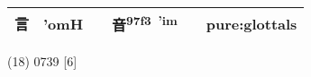 \documentclass[14pt,a4paper]{scrartcl}
\begin{document}
\begin{longtable}[c]{@{}llllll@{}}
\begin{minipage}[t]{0.14\columnwidth}
言
\strut\end{minipage} &
\begin{minipage}[t]{0.14\columnwidth}\raggedright\strut
'omH
\strut\end{minipage} &
\begin{minipage}[t]{0.14\columnwidth}\raggedright\strut
\strut\end{minipage} &
\begin{minipage}[t]{0.14\columnwidth}\raggedright\strut
音\textsuperscript{97f3~'im}
\strut\end{minipage} &
\begin{minipage}[t]{0.14\columnwidth}\raggedright\strut
\strut\end{minipage} &
\begin{minipage}[t]{0.14\columnwidth}\raggedright\strut
pure:glottals
\strut\end{minipage}\tabularnewline
\bottomrule
\end{longtable}

(18) 0739 {[}6{]}
\end{document}
